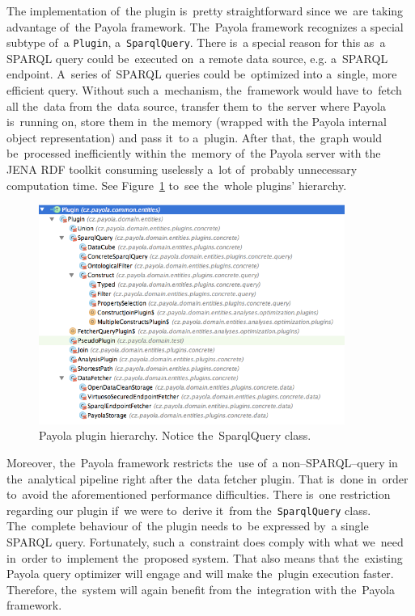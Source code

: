 The implementation of~the plugin is~pretty straightforward since we~are 
taking advantage of~the Payola framework. The~Payola framework recognizes a
special subtype of~a \texttt{Plugin}, a~\texttt{SparqlQuery}. There is~a special 
reason for this as~a SPARQL query could be~executed on~a remote data source, 
e.g. a~SPARQL endpoint. A~series of~SPARQL queries could be~optimized into a~single, more efficient query. Without such a~mechanism, the~framework would
have to~fetch all the~data from the~data source, transfer them to~the server 
where Payola is~running on, store them in~the memory (wrapped with
the Payola internal object representation) and pass it~to a~plugin. After that, the~graph would be~processed inefficiently within the~memory of~the Payola server with 
the JENA RDF toolkit consuming uselessly a~lot of~probably unnecessary computation time. See 
Figure~\ref{fig:plugin-hierarchy} to~see the~whole plugins’ hierarchy.


\begin{figure}
	\centering
	\includegraphics[width=100mm]{img/plugin-hierarchy.png}
	\caption{Payola plugin hierarchy. Notice the~SparqlQuery class.}
	\label{fig:plugin-hierarchy}
\end{figure}

Moreover, the~Payola framework restricts the~use of~a non--SPARQL--query 
in the~analytical pipeline right after the~data fetcher plugin. That is~done in~order to~avoid 
the aforementioned performance difficulties. There is~one restriction regarding our plugin if~we
were to~derive it~from the~\texttt{SparqlQuery} class. The~complete behaviour of~the plugin needs to~be expressed by~a single SPARQL query. Fortunately, such a~constraint does 
comply with what we~need in~order to~implement the~proposed system. That also means
that the~existing Payola query optimizer will engage and 
will make the~plugin execution faster. Therefore, the~system will again 
benefit from the~integration with the~Payola framework.

